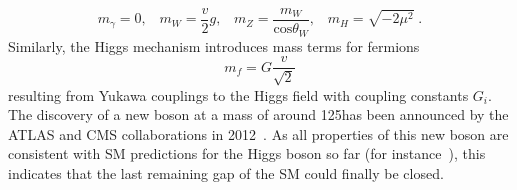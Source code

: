 \begin{description}
\begin{equation*}
m_{\gamma} = 0, \;\;\; m_W = \frac{v}{2}g, \;\;\; m_Z = \frac{m_W}{\mathrm{cos}\theta_{W}}, \;\;\; m_H = \sqrt{-2\mu^2} \;.
\end{equation*}
Similarly, the Higgs mechanism introduces mass terms for fermions 
\begin{equation*}
m_{f} = G \frac{v}{\sqrt{2}}
\end{equation*}
resulting from Yukawa couplings to the Higgs field with coupling constants $G_i$. \\
The discovery of a new boson at a mass of around 125\gev has been announced by the ATLAS and CMS collaborations in 2012~\cite{Aad:2012tfa, Chatrchyan:2012ufa}. As all properties of this new boson are consistent with SM predictions for the Higgs boson so far (\cf for instance~\cite{Aad:2013wqa, Aad:2014eva, Aad:2014eha, CMS-PAS-HIG-14-009}), this indicates that the last remaining gap of the SM could finally be closed.   
\end{description}

